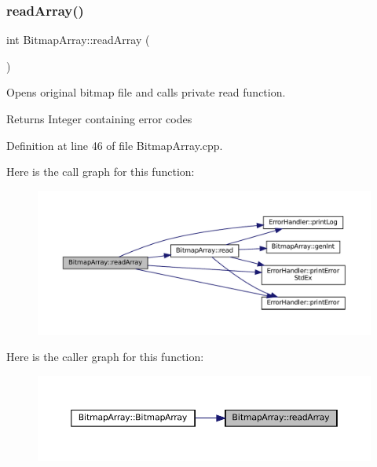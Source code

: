 \subsubsection{\texorpdfstring{readArray()}{readArray()}}
{\footnotesize\ttfamily int Bitmap\+Array\+::read\+Array (\begin{DoxyParamCaption}{ }\end{DoxyParamCaption})}



Opens original bitmap file and calls private read function. 

\begin{DoxyReturn}{Returns}
Integer containing error codes 
\end{DoxyReturn}


Definition at line 46 of file Bitmap\+Array.\+cpp.

Here is the call graph for this function\+:\nopagebreak
\begin{figure}[H]
\begin{center}
\leavevmode
\includegraphics[width=350pt]{classBitmapArray_a4ce4b5acc896040075be63a559799e7e_cgraph}
\end{center}
\end{figure}
Here is the caller graph for this function\+:\nopagebreak
\begin{figure}[H]
\begin{center}
\leavevmode
\includegraphics[width=350pt]{classBitmapArray_a4ce4b5acc896040075be63a559799e7e_icgraph}
\end{center}
\end{figure}
\mbox{\label{classBitmapArray_a432bda57a77788bfd54e3310c9e83c0c}} 
